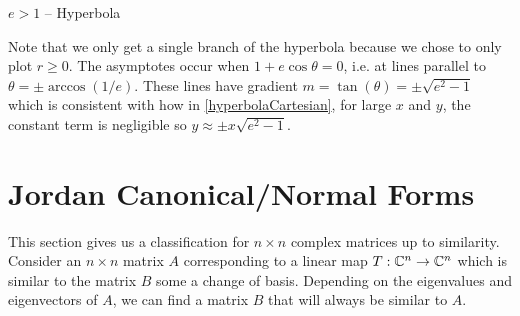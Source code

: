 \documentclass[../main.tex]{subfiles}
\begin{document}
\begin{proofcases}
\begin{case}{$e > 1$ -- Hyperbola}
\begin{center}
    \end{center}
  \end{case}
  Note that we only get a single branch of the hyperbola because we chose to only plot $r \geq 0$.
  The asymptotes occur when $1 + e \cos \theta = 0$, i.e. at lines parallel to $\theta = \pm \arccos(1/e)$.
  These lines have gradient $m = \tan(\theta) = \pm \sqrt{e^2 - 1}$ which is consistent with how in \cref{hyperbolaCartesian}, for large $x$ and $y$, the constant term is negligible so $y \approx \pm x\sqrt{e^2 - 1}$.
\end{proofcases}
\section{Jordan Canonical/Normal Forms}
This section gives us a classification for $n \times n$ complex matrices up to similarity.
Consider an $n \times n$ matrix $A$ corresponding to a linear map $T: \mathbb{C}^{n} \to \mathbb{C}^{n}$ which is similar to the matrix $B$ some a change of basis.
Depending on the eigenvalues and eigenvectors of $A$, we can find a matrix $B$ that will always be similar to $A$.
\end{document}
